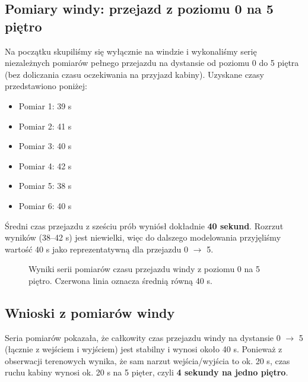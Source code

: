 \documentclass[14pt,a4paper]{extarticle}
\begin{document}
\subsection{Pomiary windy: przejazd z poziomu 0 na 5 piętro}
Na początku skupiliśmy się wyłącznie na windzie i wykonaliśmy serię niezależnych pomiarów pełnego przejazdu na dystansie od poziomu 0 do 5 piętra (bez doliczania czasu oczekiwania na przyjazd kabiny). Uzyskane czasy przedstawiono poniżej:
\begin{itemize}
    \item Pomiar 1: 39 s
    \item Pomiar 2: 41 s
    \item Pomiar 3: 40 s
    \item Pomiar 4: 42 s
    \item Pomiar 5: 38 s
    \item Pomiar 6: 40 s
\end{itemize}

Średni czas przejazdu z sześciu prób wyniósł dokładnie \textbf{40 sekund}. Rozrzut wyników (38--42 s) jest niewielki, więc do dalszego modelowania przyjęliśmy wartość 40 s jako reprezentatywną dla przejazdu 0 $\rightarrow$ 5.

\begin{figure}[H]
    \centering
    \caption{Wyniki serii pomiarów czasu przejazdu windy z poziomu 0 na 5 piętro. Czerwona linia oznacza średnią równą 40 s.}
    \label{fig:pomiary-windy-0-5}
\end{figure}

\subsection{Wnioski z pomiarów windy}
Seria pomiarów pokazała, że całkowity czas przejazdu windy na dystansie 0 $\rightarrow$ 5 (łącznie z wejściem i wyjściem) jest stabilny i wynosi około 40 s. Ponieważ z obserwacji terenowych wynika, że sam narzut wejścia/wyjścia to ok. 20 s, czas ruchu kabiny wynosi ok. 20 s na 5 pięter, czyli \textbf{4 sekundy na jedno piętro}.
\end{document}
